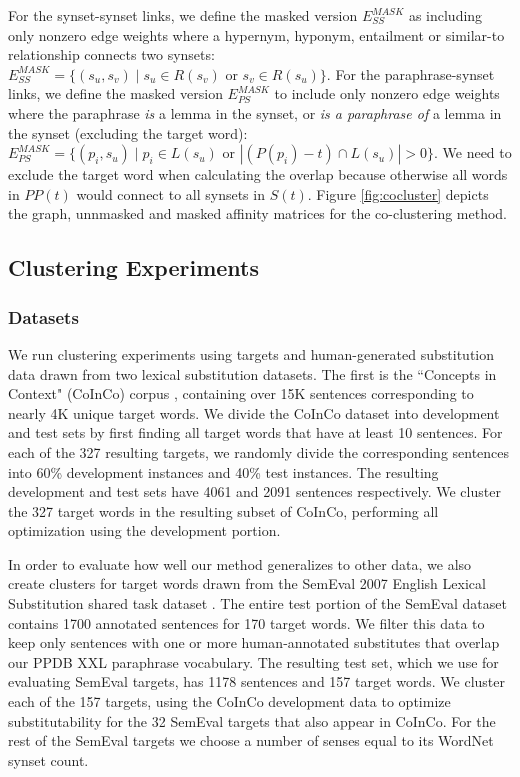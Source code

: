 \documentclass[11pt]{article}
\begin{document}
	For the synset-synset links, we define the masked version $E_{SS}^{MASK}$ as including only nonzero edge weights where a hypernym, hyponym, entailment or similar-to relationship connects two synsets: $E_{SS}^{MASK} = \{(s_u, s_v) \mid s_u \in R(s_v) \text{ or } s_v \in R(s_u)\}$. For the paraphrase-synset links, we define the masked version $E_{PS}^{MASK}$ to include only nonzero edge weights where the paraphrase \textit{is} a lemma in the synset, or \textit{is a paraphrase of} a lemma in the synset (excluding the target word): $E_{PS}^{MASK} = \{(p_i, s_u) \mid p_i \in L(s_u) \text{ or } |(P(p_i)-t) \cap L(s_u)| > 0 \}$. We need to exclude the target word when calculating the overlap because otherwise all words in $PP(t)$ would connect to all synsets in $S(t)$. Figure \ref{fig:cocluster} depicts the graph, unnmasked and masked affinity matrices for the co-clustering method. 
	
	\subsection{Clustering Experiments}
	
	\subsubsection{Datasets}
	
	We run clustering experiments using targets and human-generated substitution data drawn from two lexical substitution datasets. The first is the ``Concepts in Context" (CoInCo) corpus \cite{kremer-EtAl:2014:EACL}, containing over 15K sentences corresponding to nearly 4K unique target words. We divide the CoInCo dataset into development and test sets by first finding all target words that have at least 10 sentences. For each of the 327 resulting targets, we randomly divide the corresponding sentences into 60\% development instances and 40\% test instances. The resulting development and test sets have 4061 and 2091 sentences respectively. We cluster the 327 target words in the resulting subset of CoInCo, performing all optimization using the development portion.
	
	In order to evaluate how well our method generalizes to other data, we also create clusters for target words drawn from the SemEval 2007 English Lexical Substitution shared task dataset \cite{mccarthy-navigli:07}. The entire test portion of the SemEval dataset contains 1700 annotated sentences for 170 target words. We filter this data to keep only sentences with one or more human-annotated substitutes that overlap our PPDB XXL paraphrase vocabulary. The resulting test set, which we use for evaluating SemEval targets, has 1178 sentences and 157 target words. We cluster each of the 157 targets, using the CoInCo development data to optimize substitutability for the 32 SemEval targets that also appear in CoInCo. For the rest of the SemEval targets we choose a number of senses equal to its WordNet synset count.
	
\end{document}
